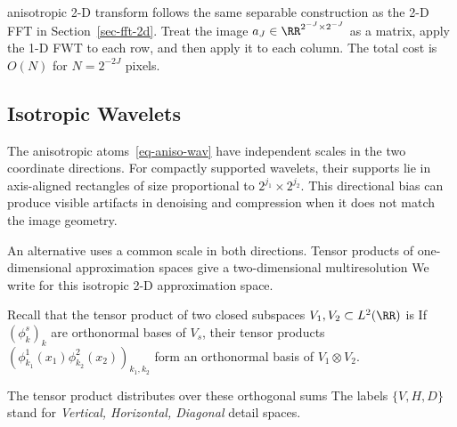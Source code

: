 anisotropic 2-D transform follows the same separable construction as the 2-D FFT in Section~\ref{sec-fft-2d}. Treat the image $a_J \in \RR^{2^{-J} \times 2^{-J}}$ as a matrix, apply the 1-D FWT to each row, and then apply it to each column. The total cost is $O(N)$ for $N=2^{-2J}$ pixels.


                                                   
\subsection{Isotropic Wavelets}\label{sec-isotropic-wav}

The anisotropic atoms~\eqref{eq-aniso-wav} have independent scales in the two coordinate directions. For compactly supported wavelets, their supports lie in axis-aligned rectangles of size proportional to $2^{j_1}\times2^{j_2}$. This directional bias can produce visible artifacts in denoising and compression when it does not match the image geometry.


An alternative uses a common scale in both directions. Tensor products of one-dimensional approximation spaces give a two-dimensional multiresolution
We write
for this isotropic 2-D approximation space.

Recall that the tensor product of two closed subspaces $V_1,V_2\subset L^2(\RR)$ is
If $(\phi_k^s)_k$ are orthonormal bases of $V_s$, their tensor products $(\phi_{k_1}^1(x_1)\phi_{k_2}^2(x_2))_{k_1,k_2}$ form an orthonormal basis of $V_1 \otimes V_2$.

The tensor product distributes over these orthogonal sums
The labels $\{V,H,D\}$ stand for \textit{Vertical, Horizontal, Diagonal} detail spaces.
 
